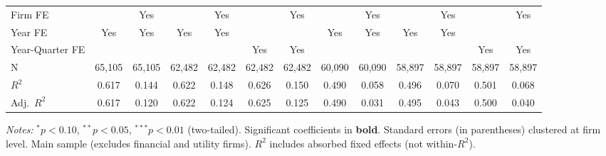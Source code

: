 \begin{landscape}
\begin{table}[H]
\begin{tabular}{lcccccccccccc}
Firm FE &  & Yes &  & Yes &  & Yes &  & Yes &  & Yes &  & Yes \\
Year FE & Yes & Yes & Yes & Yes &  &  & Yes & Yes & Yes & Yes &  &  \\
Year-Quarter FE &  &  &  &  & Yes & Yes &  &  &  &  & Yes & Yes \\
\midrule
N & 65,105 & 65,105 & 62,482 & 62,482 & 62,482 & 62,482 & 60,090 & 60,090 & 58,897 & 58,897 & 58,897 & 58,897 \\
$R^2$ & 0.617 & 0.144 & 0.622 & 0.148 & 0.626 & 0.150 & 0.490 & 0.058 & 0.496 & 0.070 & 0.501 & 0.068 \\
Adj.~$R^2$ & 0.617 & 0.120 & 0.622 & 0.124 & 0.625 & 0.125 & 0.490 & 0.031 & 0.495 & 0.043 & 0.500 & 0.040 \\
\bottomrule
\end{tabular}
\begin{minipage}{\linewidth}
\vspace{2pt}\scriptsize
\textit{Notes:} $^{*}p<0.10$, $^{**}p<0.05$, $^{***}p<0.01$ (two-tailed).
 Significant coefficients in \textbf{bold}.
 Standard errors (in parentheses) clustered at firm level.
 Main sample (excludes financial and utility firms).
 $R^2$ includes absorbed fixed effects (not within-$R^2$).
\end{minipage}
\end{table}
\end{landscape}